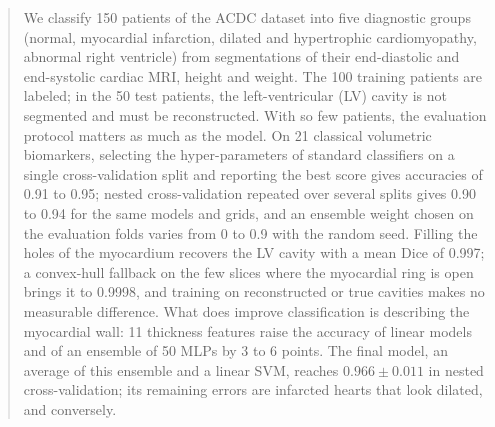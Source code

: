\begin{abstract}
We classify 150 patients of the ACDC dataset into five diagnostic groups (normal, myocardial infarction, dilated and hypertrophic cardiomyopathy, abnormal right ventricle) from segmentations of their end-diastolic and end-systolic cardiac MRI, height and weight. The 100 training patients are labeled; in the 50 test patients, the left-ventricular (LV) cavity is not segmented and must be reconstructed. With so few patients, the evaluation protocol matters as much as the model. On 21 classical volumetric biomarkers, selecting the hyper-parameters of standard classifiers on a single cross-validation split and reporting the best score gives accuracies of 0.91 to 0.95; nested cross-validation repeated over several splits gives 0.90 to 0.94 for the same models and grids, and an ensemble weight chosen on the evaluation folds varies from 0 to 0.9 with the random seed. Filling the holes of the myocardium recovers the LV cavity with a mean Dice of 0.997; a convex-hull fallback on the few slices where the myocardial ring is open brings it to 0.9998, and training on reconstructed or true cavities makes no measurable difference. What does improve classification is describing the myocardial wall: 11 thickness features raise the accuracy of linear models and of an ensemble of 50 MLPs by 3 to 6 points. The final model, an average of this ensemble and a linear SVM, reaches $0.966 \pm 0.011$ in nested cross-validation; its remaining errors are infarcted hearts that look dilated, and conversely.
\end{abstract}
